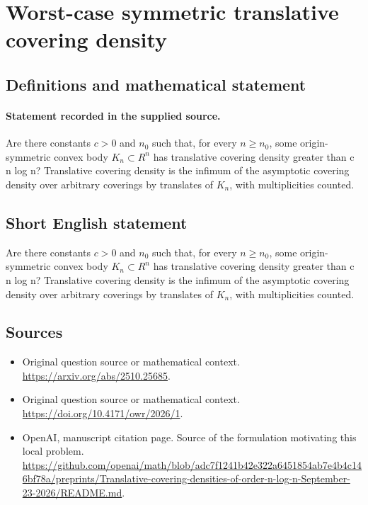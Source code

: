 \documentclass[11pt]{article}
\begin{document}
\section*{Worst-case symmetric translative covering density}\label{30007129}
\subsection{Definitions and mathematical statement}
\paragraph{Statement recorded in the supplied source.}
Are there constants $c>0$ and $n_{0}$ such that, for every $n\geq n_{0}$, some origin-symmetric convex body $K_n\subset R^{n}$ has translative covering density greater than c n log n? Translative covering density is the infimum of the asymptotic covering density over arbitrary coverings by translates of $K_n$, with multiplicities counted.
\subsection{Short English statement}
Are there constants $c>0$ and $n_{0}$ such that, for every $n\geq n_{0}$, some origin-symmetric convex body $K_n\subset R^{n}$ has translative covering density greater than c n log n? Translative covering density is the infimum of the asymptotic covering density over arbitrary coverings by translates of $K_n$, with multiplicities counted.
\subsection{Sources}
\begin{itemize}
\item[S1] Original question source or mathematical context.
\url{https://arxiv.org/abs/2510.25685}.
\item[S2] Original question source or mathematical context.
\url{https://doi.org/10.4171/owr/2026/1}.
\item[S3] OpenAI, manuscript citation page. Source of the formulation motivating this local problem.
\url{https://github.com/openai/math/blob/adc7f1241b42e322a6451854ab7e4b4c146bf78a/preprints/Translative-covering-densities-of-order-n-log-n-September-23-2026/README.md}.
\end{itemize}
\end{document}
